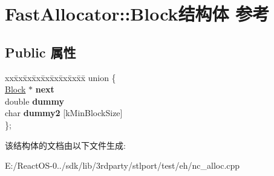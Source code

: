 \hypertarget{struct_fast_allocator_1_1_block}{}\section{Fast\+Allocator\+:\+:Block结构体 参考}
\label{struct_fast_allocator_1_1_block}
\subsection*{Public 属性}
\begin{DoxyCompactItemize}
\item 
\mbox{\label{struct_fast_allocator_1_1_block_aa96ab35e6d4579a4d0b2e0457e6f950b}} 
\begin{tabbing}
xx\=xx\=xx\=xx\=xx\=xx\=xx\=xx\=xx\=\kill
union \{\\
\>\hyperlink{struct_fast_allocator_1_1_block}{Block} $\ast$ {\bfseries next}\\
\>double {\bfseries dummy}\\
\>char {\bfseries dummy2} \mbox{[}kMinBlockSize\mbox{]}\\
\}; \\

\end{tabbing}\end{DoxyCompactItemize}


该结构体的文档由以下文件生成\+:\begin{DoxyCompactItemize}
\item 
E\+:/\+React\+O\+S-\/0../sdk/lib/3rdparty/stlport/test/eh/nc\+\_\+alloc.\+cpp\end{DoxyCompactItemize}
